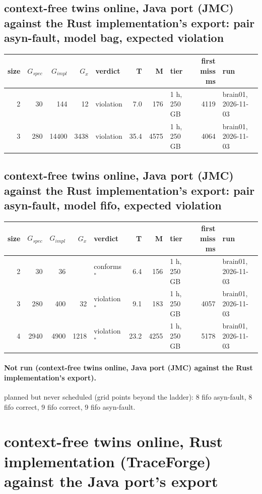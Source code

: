 \documentclass[10pt]{article}
\begin{document}
\subsection*{context-free twins online, Java port (JMC) against the Rust implementation's export: pair \textsf{asyn-fault}, model bag, expected violation}
\begin{longtable}{@{}rrrrlrrlrl@{}}
\toprule
size & $G_{\mathit{spec}}$ & $G_{\mathit{impl}}$ & $G_x$ & verdict & T & M & tier & first miss ms & run \\
\midrule
\endhead
\color{blue} 2 & 30 & 144 & 12 & violation & 7.0 & 176 & 1 h, 250 GB & 4119 & brain01, 2026-11-03 \\
\color{blue} 3 & 280 & 14400 & 3438 & violation & 35.4 & 4575 & 1 h, 250 GB & 4064 & brain01, 2026-11-03 \\
\bottomrule
\end{longtable}
\subsection*{context-free twins online, Java port (JMC) against the Rust implementation's export: pair \textsf{asyn-fault}, model fifo, expected violation}
\begin{longtable}{@{}rrrrlrrlrl@{}}
\toprule
size & $G_{\mathit{spec}}$ & $G_{\mathit{impl}}$ & $G_x$ & verdict & T & M & tier & first miss ms & run \\
\midrule
\endhead
\color{blue} 2 & 30 & 36 &  & conforms$^{\ast}$ & 6.4 & 156 & 1 h, 250 GB &  & brain01, 2026-11-03 \\
\color{blue} 3 & 280 & 400 & 32 & violation$^{\ast}$ & 9.1 & 183 & 1 h, 250 GB & 4057 & brain01, 2026-11-03 \\
\color{blue} 4 & 2940 & 4900 & 1218 & violation$^{\ast}$ & 23.2 & 4255 & 1 h, 250 GB & 5178 & brain01, 2026-11-03 \\
\bottomrule
\end{longtable}
\paragraph{Not run (context-free twins online, Java port (JMC) against the Rust implementation's export).}
planned but never scheduled (grid points beyond the ladder): 8 fifo asyn-fault, 8 fifo correct, 9 fifo correct, 9 fifo asyn-fault.\par
\section*{context-free twins online, Rust implementation (TraceForge) against the Java port's export}
\end{document}
